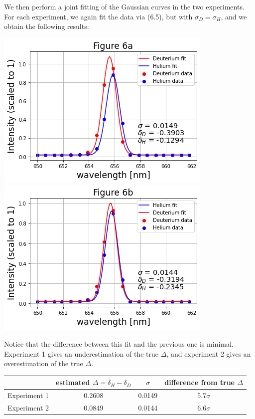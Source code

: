 \documentclass[11pt]{book}
\theoremstyle{break}
\theoremstyle{break}
\begin{document}
We then perform a joint fitting of the Gaussian curves in the two experiments. For each experiment, we again fit the data via (6.5), but with $\sigma_D = \sigma_H$, and we obtain the following results:
\begin{center}
\includegraphics[scale=0.55]{6a}
\includegraphics[scale=0.55]{6b}
\end{center}
Notice that the difference between this fit and the previous one is minimal. Experiment 1 gives an underestimation of the true $\Delta$, and experiment 2 gives an overestimation of the true $\Delta$. 
\begin{center}
\begin{tabular}{|c|c|c|c|}
\hline
& estimated $\Delta = \delta_H - \delta_D$ & $\sigma$ & difference from true $\Delta$\\
\hline
Experiment 1 & 0.2608 & 0.0149 & $5.7\sigma$\\ 
\hline
Experiment 2 & 0.0849 & 0.0144 & $6.6\sigma$\\
\hline
\end{tabular}
\end{center}
\end{document}
